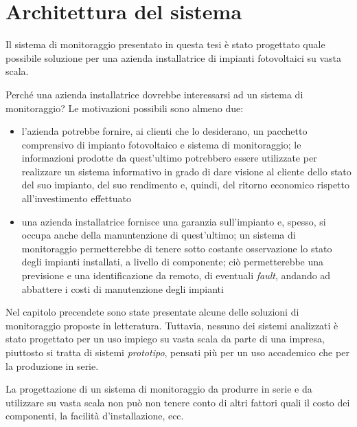 \clearpage{\pagestyle{empty}\cleardoublepage}
\chapter{Architettura del sistema}
%
Il sistema di monitoraggio presentato in questa tesi \`e stato progettato 
quale possibile soluzione per una azienda installatrice di impianti fotovoltaici 
su vasta scala.
%

%
Perch\'e una azienda installatrice dovrebbe interessarsi ad un sistema 
di monitoraggio? Le motivazioni possibili sono almeno due:
%
\begin{itemize}
\item l'azienda potrebbe fornire, ai clienti che lo desiderano, un pacchetto 
      comprensivo di impianto fotovoltaico e sistema di monitoraggio; le 
      informazioni prodotte da quest'ultimo potrebbero essere utilizzate 
      per realizzare un sistema informativo in grado di dare visione 
      al cliente  dello stato del suo impianto,  del 
      suo rendimento e, quindi,  del ritorno economico 
      rispetto all'investimento effettuato
%
\item una azienda installatrice fornisce una garanzia sull'impianto e, spesso, 
      si occupa anche della manuntenzione di quest'ultimo; un sistema di 
      monitoraggio permetterebbe di tenere sotto costante osservazione 
      lo stato degli impianti installati, a livello di componente; ci\`o
      permetterebbe una previsione e una identificazione da remoto, di 
      eventuali \emph{fault}, andando ad abbattere i costi di manutenzione
      degli impianti
\end{itemize}
%

%
Nel capitolo precendete sono state presentate alcune delle soluzioni di 
monitoraggio proposte in letteratura. Tuttavia, nessuno dei sistemi analizzati 
\`e stato progettato per un uso impiego su vasta scala da parte di una impresa, 
piuttosto si tratta di sistemi \emph{prototipo}, pensati pi\`u per un uso 
accademico che per la produzione in serie.
%

%
La progettazione di un sistema di monitoraggio da produrre in serie e da utilizzare su 
vasta scala non pu\`o non tenere conto di altri fattori quali il costo dei 
componenti, la facilit\`a d'installazione, ecc.
%


